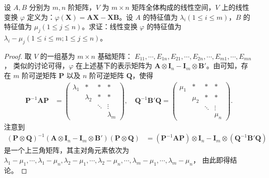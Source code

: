 \documentclass[../../main.tex]{subfiles}%
\begin{document}
\begin{proposition}\label{proposition:线性变换AX-XB的表示矩阵和特征值}
设 $A,B$ 分别为 $m,n$ 阶矩阵，$V$ 为 $m \times n$ 矩阵全体构成的线性空间，$V$ 上的线性变换 $\varphi$ 定义为：$\varphi(\boldsymbol{X}) = \boldsymbol{AX} - \boldsymbol{XB}$。设 $A$ 的特征值为 $\lambda_i (1 \leqslant  i \leqslant  m)$，$B$ 的特征值为 $\mu_j (1 \leqslant  j \leqslant  n)$。求证：线性变换 $\varphi$ 的特征值为 $\lambda_i - \mu_j (1 \leqslant  i \leqslant  m; 1 \leqslant  j \leqslant  n)$。
\end{proposition}
\begin{proof}

取 $V$ 的一组基为 $m \times n$ 基础矩阵：
$E_{11},\cdots, E_{1n}, E_{21},\cdots, E_{2n},\cdots, E_{m1},\cdots, E_{mn}$，
类似的讨论可得，$\varphi$ 在上述基下的表示矩阵为 $\boldsymbol{A} \otimes \boldsymbol{I}_n - \boldsymbol{I}_m \otimes \boldsymbol{B}'$。由可知，存在 $m$ 阶可逆矩阵 $\boldsymbol{P}$ 以及 $n$ 阶可逆矩阵 $\boldsymbol{Q}$，使得
\begin{align*}
\boldsymbol{P}^{-1}\boldsymbol{AP} &= 
\begin{pmatrix}
\lambda_1 & * & * & * \\
 & \lambda_2 & * & * \\
 & & \ddots & \vdots \\
 & & & \lambda_m
\end{pmatrix}, \quad
\boldsymbol{Q}^{-1}\boldsymbol{B}'\boldsymbol{Q} = 
\begin{pmatrix}
\mu_1 & * & * & * \\
 & \mu_2 & * & * \\
 & & \ddots & \vdots \\
 & & & \mu_n
\end{pmatrix}.
\end{align*}
注意到
\begin{align*}
(\boldsymbol{P} \otimes \boldsymbol{Q})^{-1}(\boldsymbol{A} \otimes \boldsymbol{I}_n - \boldsymbol{I}_m \otimes \boldsymbol{B}')(\boldsymbol{P} \otimes \boldsymbol{Q}) 
&= (\boldsymbol{P}^{-1}\boldsymbol{AP}) \otimes \boldsymbol{I}_n - \boldsymbol{I}_m \otimes (\boldsymbol{Q}^{-1}\boldsymbol{B}'\boldsymbol{Q})
\end{align*}
是一个上三角矩阵，其主对角元素依次为
$\lambda_1 - \mu_1,\cdots, \lambda_1 - \mu_n, \lambda_2 - \mu_1,\cdots, \lambda_2 - \mu_n,\cdots, \lambda_m - \mu_1,\cdots, \lambda_m - \mu_n$，
由此即得结论。

\end{proof}
\end{document}
